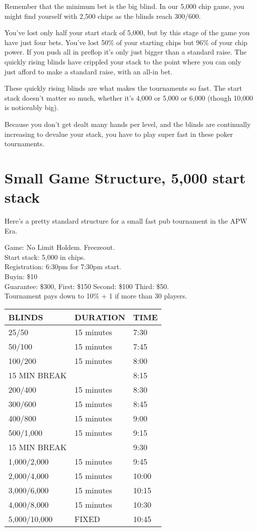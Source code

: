 Remember that the minimum bet is the big blind. In our 5,000 chip
game, you might find yourself with 2,500 chips as the blinds reach 300/600.

You've lost only half your start stack of 5,000, but by this
stage of the game you have just four bets. You've lost 50\% of your
starting chips but 96\% of your chip power. If you push all
in preflop it's only just bigger than a standard raise. The quickly rising blinds have
crippled your stack to the point where you can only just afford to make
a standard raise, with an all-in bet.

These quickly rising blinds are what makes the tournaments so fast.
The start stack doesn't matter so much, whether it's 4,000 or 5,000
or 6,000 (though 10,000 is noticeably big).

Because you don't get dealt many hands per level, and the blinds are
continually increasing to devalue your stack, you have to play super fast
in these poker tournaments.

\section{Small Game Structure, 5,000 start stack}

Here's a pretty standard structure for a small fast pub tournament
in the APW Era.

Game: No Limit Holdem. Freezeout. \\
Start stack: 5,000 in chips. \\
Registration: 6:30pm for 7:30pm start. \\
Buyin: \$10 \\
Guarantee: \$300, First: \$150 Second: \$100 Third: \$50. \\
Tournament pays down to 10\% + 1 if more than 30 players.

\begin{tabular}{|l|l|l|} \hline
BLINDS  &  DURATION   & TIME \\ \hline
25/50   &  15 minutes & 7:30 \\ \hline
50/100  &  15 minutes & 7:45 \\ \hline
100/200 &  15 minutes & 8:00 \\ \hline
15 MIN BREAK &        & 8:15 \\ \hline
200/400 &  15 minutes & 8:30 \\ \hline
300/600 &  15 minutes & 8:45 \\ \hline
400/800 &  15 minutes & 9:00 \\ \hline
500/1,000 & 15 minutes & 9:15 \\ \hline
15 MIN BREAK  &        & 9:30 \\ \hline
1,000/2,000 & 15 minutes & 9:45 \\ \hline
2,000/4,000 & 15 minutes & 10:00 \\ \hline
3,000/6,000 & 15 minutes & 10:15 \\ \hline
4,000/8,000 & 15 minutes & 10:30 \\ \hline
5,000/10,000 & FIXED & 10:45 \\ \hline
\end{tabular}


